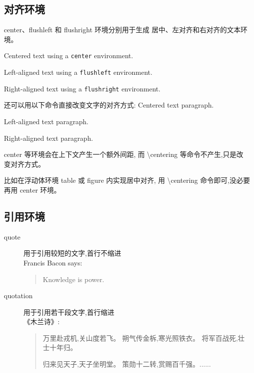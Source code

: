 \documentclass[a4paper]{ctexart}
\begin{document}
    \subsection{对齐环境}
    center、flushleft 和 flushright 环境分别用于生成%
    居中、左对齐和右对齐的文本环境。
    \begin{center}
        Centered text using a
        \verb|center| environment.
    \end{center}
    \begin{flushleft}
        Left-aligned text using a
        \verb|flushleft| environment.
    \end{flushleft}
    \begin{flushright}
        Right-aligned text using a
        \verb|flushright| environment.
    \end{flushright}
    还可以用以下命令直接改变文字的对齐方式:
    \centering
    Centered text paragraph.\par
    \raggedright
    Left-aligned text paragraph.\par
    \raggedleft
    Right-aligned text paragraph.\par
    \begin{flushleft}
        center 等环境会在上下文产生一个额外间距,%
        而 \textbackslash centering 等命令不产生,只是改变对齐方式。%
    \end{flushleft}
    \raggedright
    比如在浮动体环境 table 或 figure 内实现居中对齐,%
    用 \textbackslash centering 命令即可,没必要再用 center 环境。
    \subsection{引用环境}
    \begin{description}
        \item[quote] 用于引用较短的文字,首行不缩进\\
        Francis Bacon says:
        \begin{quote}
            Knowledge is power.
        \end{quote}
        \item[quotation] 用于引用若干段文字,首行缩进\\
        《木兰诗》:
        \begin{quotation}
            万里赴戎机,关山度若飞。
            朔气传金柝,寒光照铁衣。
            将军百战死,壮士十年归。

            归来见天子,天子坐明堂。
            策勋十二转,赏赐百千强。......
        \end{quotation} 
    \end{description}
\end{document}
